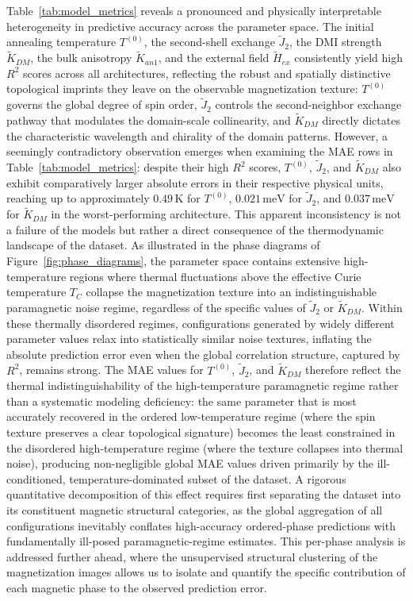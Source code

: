 \documentclass[final,5p,times,twocolumn]{elsarticle}
\begin{document}
Table~\ref{tab:model_metrics} reveals a
pronounced and physically interpretable heterogeneity in predictive
accuracy across the parameter space. The initial annealing temperature
$T^{(0)}$, the second-shell exchange $\tilde{J}_2$, the DMI strength
$\tilde{K}_{DM}$, the bulk anisotropy $\tilde{K}_{an1}$, and the
external field $\tilde{H}_{ex}$ consistently yield high $R^2$
scores across all architectures, reflecting the robust and spatially
distinctive topological imprints they leave on the observable
magnetization texture: $T^{(0)}$ governs the global degree of spin
order, $\tilde{J}_2$ controls the second-neighbor exchange pathway
that modulates the domain-scale collinearity, and $\tilde{K}_{DM}$
directly dictates the characteristic wavelength and chirality of the
domain patterns. However, a seemingly contradictory observation
emerges when examining the MAE rows in Table~\ref{tab:model_metrics}:
despite their high $R^2$ scores, $T^{(0)}$, $\tilde{J}_2$, and
$\tilde{K}_{DM}$ also exhibit comparatively larger absolute errors in
their respective physical units, reaching up to approximately
$0.49\,\mathrm{K}$ for $T^{(0)}$, $0.021\,\mathrm{meV}$ for
$\tilde{J}_2$, and $0.037\,\mathrm{meV}$ for $\tilde{K}_{DM}$ in the
worst-performing architecture. This apparent inconsistency is not a
failure of the models but rather a direct consequence of the
thermodynamic landscape of the dataset. As illustrated in the phase
diagrams of Figure~\ref{fig:phase_diagrams}, the parameter space
contains extensive high-temperature regions where thermal
fluctuations above the effective Curie temperature $T_C$ collapse the
magnetization texture into an indistinguishable paramagnetic noise
regime, regardless of the specific values of $\tilde{J}_2$ or
$\tilde{K}_{DM}$. Within these thermally disordered regimes,
configurations generated by widely different parameter values relax
into statistically similar noise textures, inflating the absolute
prediction error even when the global correlation structure, 
captured by $R^2$,  remains strong. The MAE values for $T^{(0)}$,
$\tilde{J}_2$, and $\tilde{K}_{DM}$ therefore reflect the thermal
indistinguishability of the high-temperature paramagnetic regime
rather than a systematic modeling deficiency: the same parameter that
is most accurately recovered in the ordered low-temperature regime
(where the spin texture preserves a clear topological signature)
becomes the least constrained in the disordered high-temperature
regime (where the texture collapses into thermal noise), producing
non-negligible global MAE values driven primarily by the
ill-conditioned, temperature-dominated subset of the dataset. A rigorous quantitative
decomposition of this effect requires first separating the dataset
into its constituent magnetic structural categories, as the global
aggregation of all configurations inevitably conflates high-accuracy
ordered-phase predictions with fundamentally ill-posed
paramagnetic-regime estimates. This per-phase analysis is addressed
further ahead, where the unsupervised structural clustering of the
magnetization images allows us to isolate and quantify the specific
contribution of each magnetic phase to the observed prediction error.
\end{document}
